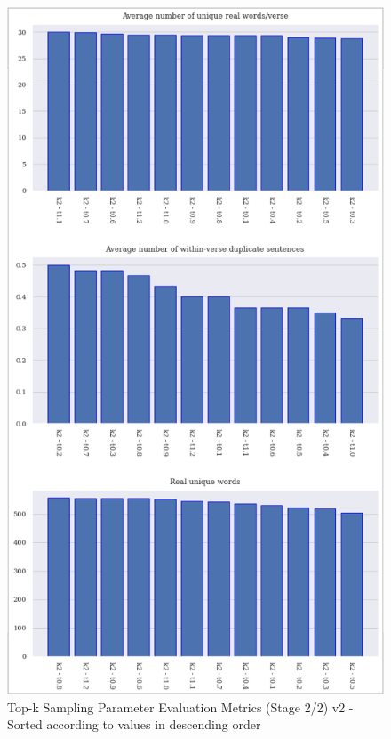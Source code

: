\begin{figure}[h]
    \centering
    \includegraphics[scale=0.85,keepaspectratio=true]{figures/top-k_param_eval_s2_2.png}
    \caption{Top-k Sampling Parameter Evaluation Metrics (Stage 2/2) v2 - Sorted according to values in descending order}
    \label{fig:top-k-param-eval-s2-v2}
\end{figure}


